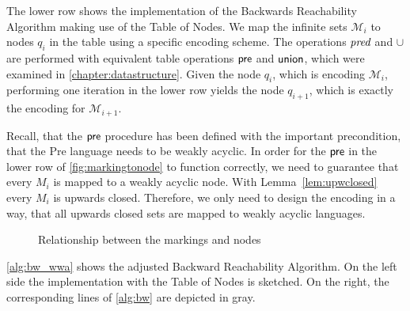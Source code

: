 \par 

The lower row shows the implementation of the Backwards Reachability Algorithm making use of the Table of Nodes. We map the infinite sets $\mathcal{M}_{i}$ to nodes $q_{i}$ in the table using a specific encoding scheme. The operations $\operatorname{\textit{pred}}$ and $\cup$ are performed with equivalent table operations $\operatorname{\textsf{pre}}$ and $\operatorname{\textsf{union}}$, which were examined in \autoref{chapter:datastructure}.
Given the node $q_{i}$, which is encoding $\mathcal{M}_{i}$, performing one iteration in the lower row yields the node $q_{i+1}$, which is exactly the encoding for $\mathcal{M}_{i+1}$.

Recall, that the $\operatorname{\textsf{pre}}$ procedure has been defined with the important precondition, that the Pre language needs to be weakly acyclic. In order for the $\operatorname{\textsf{pre}}$ in the lower row of \autoref{fig:markingtonode} to function correctly, we need to guarantee that every $M_{i}$ is mapped to a weakly acyclic node. With Lemma~\autoref{lem:upwclosed} every $M_{i}$ is upwards closed. Therefore, we only need to design the encoding in a way, that all upwards closed sets are mapped to weakly acyclic languages.

\begin{figure}[htb]
\centering
\caption{Relationship between the markings and nodes}\label{fig:markingtonode}
\end{figure}

\par

\autoref{alg:bw_wwa} shows the adjusted Backward Reachability Algorithm. On the left side the implementation with the Table of Nodes is sketched. On the right, the corresponding lines of \autoref{alg:bw} are depicted in gray.

\par 

